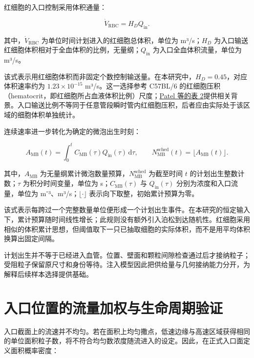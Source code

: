 \documentclass[UTF8,a4paper,11pt,fontset=fandol]{ctexart}
\begin{document}
红细胞的入口控制采用体积通量：

\begin{equation}
\dot V_{\mathrm{RBC}}=H_D Q_{\mathrm{in}} .
\label{eq:13}
\end{equation}

其中，\(\dot V_{\mathrm{RBC}}\) 为单位时间计划进入的红细胞总体积，单位为 m³/s；\(H_D\) 为入口输送红细胞体积相对于全血体积的比例，无量纲；\(Q_{\mathrm{in}}\) 为入口全血体积流量，单位为 m³/s。

该式表示用红细胞体积而非固定个数控制输送量。在本研究中，\(H_D=0.45\)，对应体积速率约为 \(1.23\times10^{-15}\) m³/s。这一选择参考 C57BL/6 的红细胞压积（hematocrit，即红细胞所占血液体积比例）尺度；\href{https://pmc.ncbi.nlm.nih.gov/articles/PMC11808370/}{Patel 等的表 2}提供相关背景。入口输送比例不等同于任意管段瞬时管内红细胞压积，后者应由实际处于该区域的细胞体积单独统计。

连续速率进一步转化为确定的微泡出生时刻：

\begin{equation}
A_{\mathrm{MB}}(t)=\int_0^t C_{\mathrm{MB}}(\tau)Q_{\mathrm{in}}(\tau)\,\mathrm{d}\tau,
\qquad N_{\mathrm{MB}}^{\mathrm{sched}}(t)=\lfloor A_{\mathrm{MB}}(t)\rfloor .
\label{eq:14}
\end{equation}

其中，\(A_{\mathrm{MB}}\) 为无量纲累计微泡数量预算，\(N_{\mathrm{MB}}^{\mathrm{sched}}\) 为截至时间 \(t\) 的计划出生整数计数；\(\tau\) 为积分时间变量，单位为 s；\(C_{\mathrm{MB}}(\tau)\) 与 \(Q_{\mathrm{in}}(\tau)\) 分别为浓度和入口流量，单位为 m⁻³、m³/s；\(\lfloor\cdot\rfloor\) 表示向下取整，初始累计预算为零。

该式表示每跨过一个完整数量单位便形成一个计划出生事件。在本研究的恒定输入下，累计预算随时间线性增长；此规则没有额外引入泊松到达随机性。红细胞采用相似的体积累计思想，但阈值取下一只已抽取细胞的实际体积，而不是用平均体积换算出固定间隔。

计划出生并不等于已经进入血管。位置、壁面和颗粒间隙检查通过后才接纳粒子；受阻粒子保留原尺寸和身份等待。注入模型因此把供给量与几何接纳能力分开，为解释后续样本选择提供基础。

\section{入口位置的流量加权与生命周期验证}

入口截面上的流速并不均匀。若在面积上均匀撒点，低速边缘与高速区域获得相同的单位面积粒子数，将不符合均匀数浓度随流进入的设定。因此，在正式入口面定义面积概率密度：
\end{document}
